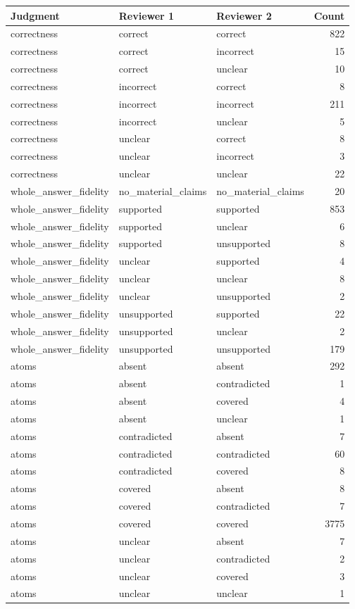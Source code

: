 \begin{tabular}{lllr}
\toprule
Judgment & Reviewer 1 & Reviewer 2 & Count \\
\midrule
correctness & correct & correct & 822 \\
correctness & correct & incorrect & 15 \\
correctness & correct & unclear & 10 \\
correctness & incorrect & correct & 8 \\
correctness & incorrect & incorrect & 211 \\
correctness & incorrect & unclear & 5 \\
correctness & unclear & correct & 8 \\
correctness & unclear & incorrect & 3 \\
correctness & unclear & unclear & 22 \\
whole\_answer\_fidelity & no\_material\_claims & no\_material\_claims & 20 \\
whole\_answer\_fidelity & supported & supported & 853 \\
whole\_answer\_fidelity & supported & unclear & 6 \\
whole\_answer\_fidelity & supported & unsupported & 8 \\
whole\_answer\_fidelity & unclear & supported & 4 \\
whole\_answer\_fidelity & unclear & unclear & 8 \\
whole\_answer\_fidelity & unclear & unsupported & 2 \\
whole\_answer\_fidelity & unsupported & supported & 22 \\
whole\_answer\_fidelity & unsupported & unclear & 2 \\
whole\_answer\_fidelity & unsupported & unsupported & 179 \\
atoms & absent & absent & 292 \\
atoms & absent & contradicted & 1 \\
atoms & absent & covered & 4 \\
atoms & absent & unclear & 1 \\
atoms & contradicted & absent & 7 \\
atoms & contradicted & contradicted & 60 \\
atoms & contradicted & covered & 8 \\
atoms & covered & absent & 8 \\
atoms & covered & contradicted & 7 \\
atoms & covered & covered & 3775 \\
atoms & unclear & absent & 7 \\
atoms & unclear & contradicted & 2 \\
atoms & unclear & covered & 3 \\
atoms & unclear & unclear & 1 \\
\bottomrule
\end{tabular}
